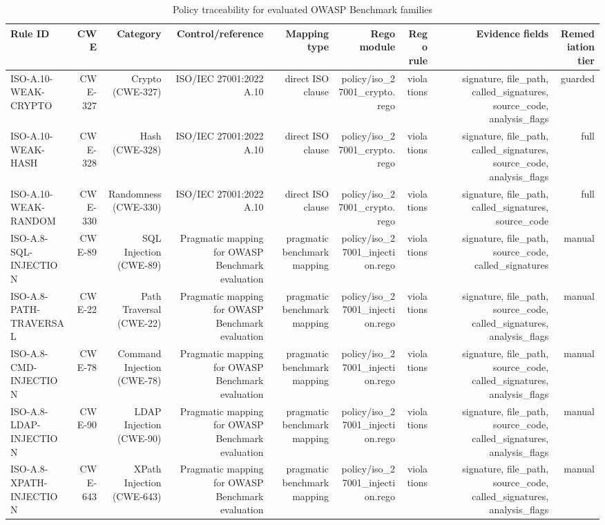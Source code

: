 \begin{table}[h]
\centering
\begin{tabular}{lrrrrrrrr}
\hline
Rule ID & CWE & Category & Control/reference & Mapping type & Rego module & Rego rule & Evidence fields & Remediation tier \\
\hline
ISO-A.10-WEAK-CRYPTO & CWE-327 & Crypto (CWE-327) & ISO/IEC 27001:2022 A.10 & direct ISO clause & policy/iso\_27001\_crypto.rego & violations & signature, file\_path, called\_signatures, source\_code, analysis\_flags & guarded \\
ISO-A.10-WEAK-HASH & CWE-328 & Hash (CWE-328) & ISO/IEC 27001:2022 A.10 & direct ISO clause & policy/iso\_27001\_crypto.rego & violations & signature, file\_path, called\_signatures, source\_code, analysis\_flags & full \\
ISO-A.10-WEAK-RANDOM & CWE-330 & Randomness (CWE-330) & ISO/IEC 27001:2022 A.10 & direct ISO clause & policy/iso\_27001\_crypto.rego & violations & signature, file\_path, called\_signatures, source\_code & full \\
ISO-A.8-SQL-INJECTION & CWE-89 & SQL Injection (CWE-89) & Pragmatic mapping for OWASP Benchmark evaluation & pragmatic benchmark mapping & policy/iso\_27001\_injection.rego & violations & signature, file\_path, source\_code, called\_signatures & manual \\
ISO-A.8-PATH-TRAVERSAL & CWE-22 & Path Traversal (CWE-22) & Pragmatic mapping for OWASP Benchmark evaluation & pragmatic benchmark mapping & policy/iso\_27001\_injection.rego & violations & signature, file\_path, source\_code, called\_signatures, analysis\_flags & manual \\
ISO-A.8-CMD-INJECTION & CWE-78 & Command Injection (CWE-78) & Pragmatic mapping for OWASP Benchmark evaluation & pragmatic benchmark mapping & policy/iso\_27001\_injection.rego & violations & signature, file\_path, source\_code, called\_signatures, analysis\_flags & manual \\
ISO-A.8-LDAP-INJECTION & CWE-90 & LDAP Injection (CWE-90) & Pragmatic mapping for OWASP Benchmark evaluation & pragmatic benchmark mapping & policy/iso\_27001\_injection.rego & violations & signature, file\_path, source\_code, called\_signatures, analysis\_flags & manual \\
ISO-A.8-XPATH-INJECTION & CWE-643 & XPath Injection (CWE-643) & Pragmatic mapping for OWASP Benchmark evaluation & pragmatic benchmark mapping & policy/iso\_27001\_injection.rego & violations & signature, file\_path, source\_code, called\_signatures, analysis\_flags & manual \\
\hline
\end{tabular}
\caption{Policy traceability for evaluated OWASP Benchmark families}
\end{table}
